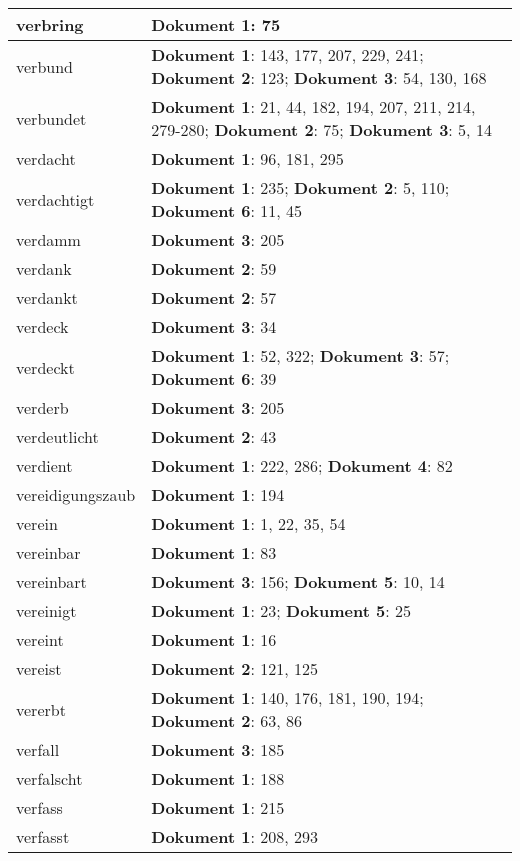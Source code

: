 \documentclass[a5paper]{article}
\begin{document}
\begin{longtable}[l]{|l|p{3in}|}
\hline
verbring & \textbf{Dokument 1}: 75 \\
\hline
verbund & \textbf{Dokument 1}: 143, 177, 207, 229, 241; \textbf{Dokument 2}: 123; \textbf{Dokument 3}: 54, 130, 168 \\
\hline
verbundet & \textbf{Dokument 1}: 21, 44, 182, 194, 207, 211, 214, 279-280; \textbf{Dokument 2}: 75; \textbf{Dokument 3}: 5, 14 \\
\hline
verdacht & \textbf{Dokument 1}: 96, 181, 295 \\
\hline
verdachtigt & \textbf{Dokument 1}: 235; \textbf{Dokument 2}: 5, 110; \textbf{Dokument 6}: 11, 45 \\
\hline
verdamm & \textbf{Dokument 3}: 205 \\
\hline
verdank & \textbf{Dokument 2}: 59 \\
\hline
verdankt & \textbf{Dokument 2}: 57 \\
\hline
verdeck & \textbf{Dokument 3}: 34 \\
\hline
verdeckt & \textbf{Dokument 1}: 52, 322; \textbf{Dokument 3}: 57; \textbf{Dokument 6}: 39 \\
\hline
verderb & \textbf{Dokument 3}: 205 \\
\hline
verdeutlicht & \textbf{Dokument 2}: 43 \\
\hline
verdient & \textbf{Dokument 1}: 222, 286; \textbf{Dokument 4}: 82 \\
\hline
vereidigungszaub & \textbf{Dokument 1}: 194 \\
\hline
verein & \textbf{Dokument 1}: 1, 22, 35, 54 \\
\hline
vereinbar & \textbf{Dokument 1}: 83 \\
\hline
vereinbart & \textbf{Dokument 3}: 156; \textbf{Dokument 5}: 10, 14 \\
\hline
vereinigt & \textbf{Dokument 1}: 23; \textbf{Dokument 5}: 25 \\
\hline
vereint & \textbf{Dokument 1}: 16 \\
\hline
vereist & \textbf{Dokument 2}: 121, 125 \\
\hline
vererbt & \textbf{Dokument 1}: 140, 176, 181, 190, 194; \textbf{Dokument 2}: 63, 86 \\
\hline
verfall & \textbf{Dokument 3}: 185 \\
\hline
verfalscht & \textbf{Dokument 1}: 188 \\
\hline
verfass & \textbf{Dokument 1}: 215 \\
\hline
verfasst & \textbf{Dokument 1}: 208, 293 \\
\hline

\end{longtable}
\end{document}
